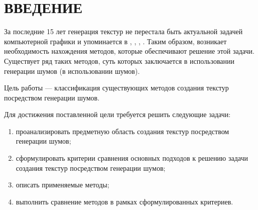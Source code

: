\chapter*{ВВЕДЕНИЕ}

За последние 15 лет генерация текстур не перестала быть актуальной задачей компьютерной графики и упоминается в \cite{8942651}, \cite{10042545}, \cite{TRINCHAOANDRADE201228}, \cite{Groueix_2018_CVPR}.
Таким образом, возникает необходимость нахождения методов, которые обеспечивают решение этой задачи.
Существует ряд таких методов, суть которых заключается в использовании генерации шумов (в использовании шумов).

Цель работы --- классификация существующих методов создания текстур посредством генерации шумов.

Для достижения поставленной цели требуется решить следующие задачи:
\begin{enumerate}
	\item проанализировать предметную область создания текстур посредством генерации шумов;
	\item сформулировать критерии сравнения основных подходов к решению задачи создания текстур посредством генерации шумов;
	\item описать применяемые методы;
	\item выполнить сравнение методов в рамках сформулированных критериев.
\end{enumerate}